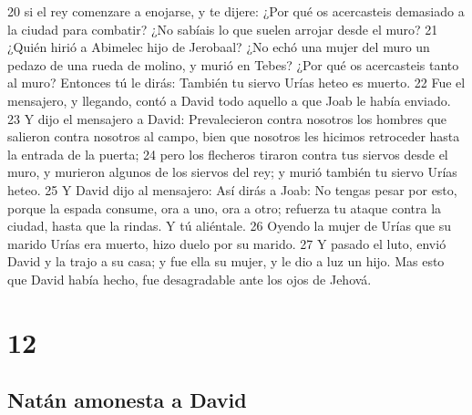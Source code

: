 20 si el rey comenzare a enojarse, y te dijere: ¿Por qué os acercasteis demasiado a la ciudad para combatir? ¿No sabíais lo que suelen arrojar desde el muro?
21 ¿Quién hirió a Abimelec hijo de Jerobaal? ¿No echó una mujer del muro un pedazo de una rueda de molino, y murió en Tebes? ¿Por qué os acercasteis tanto al muro? Entonces tú le dirás: También tu siervo Urías heteo es muerto.
22 Fue el mensajero, y llegando, contó a David todo aquello a que Joab le había enviado.
23 Y dijo el mensajero a David: Prevalecieron contra nosotros los hombres que salieron contra nosotros al campo, bien que nosotros les hicimos retroceder hasta la entrada de la puerta;
24 pero los flecheros tiraron contra tus siervos desde el muro, y murieron algunos de los siervos del rey; y murió también tu siervo Urías heteo.
25 Y David dijo al mensajero: Así dirás a Joab: No tengas pesar por esto, porque la espada consume, ora a uno, ora a otro; refuerza tu ataque contra la ciudad, hasta que la rindas. Y tú aliéntale.
26 Oyendo la mujer de Urías que su marido Urías era muerto, hizo duelo por su marido.
27 Y pasado el luto, envió David y la trajo a su casa; y fue ella su mujer, y le dio a luz un hijo. Mas esto que David había hecho, fue desagradable ante los ojos de Jehová.

\chapter{12}

\section*{Natán amonesta a David}

